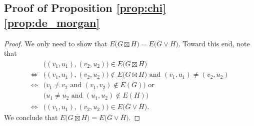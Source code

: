 \documentclass[journal, onecolumn, draftcls]{IEEEtran}
\theoremstyle{definition}
\begin{document}
\subsection{Proof of Proposition \ref{prop:chi} \ref{prop:de_morgan}}
\begin{proof}
We only need to show that $E\big (    \overline{G\boxtimes H} \big ) = E\big (    \overline{G}\lor \overline{H}  \big )$. Toward this end, note that
\begin{align*}
&\big( (v_1,u_1),(v_2,u_2) \big)\in E\big (    \overline{G\boxtimes H} \big )\\
\Leftrightarrow&\big( (v_1,u_1),(v_2,u_2)\big) \notin E\big (    G\boxtimes H  \big )\text{~and~}(v_1,u_1)\ne(v_2,u_2)\\
\Leftrightarrow&\big( v_1\ne v_2\text{ and }(v_1,v_2)  \notin E(G) \big )\text{ or } \\
&\big( u_1\ne u_2\text{ and }(u_1,u_2) \notin E(H) \big ) \\
\Leftrightarrow&\big( (v_1,u_1),(v_2,u_2) \big)\in E\big (    \overline{G}\lor \overline{H}  \big ).
\end{align*}
We conclude that $E\big (    \overline{G\boxtimes H} \big ) = E\big (    \overline{G}\lor \overline{H}  \big )$.
\end{proof}
\end{document}

